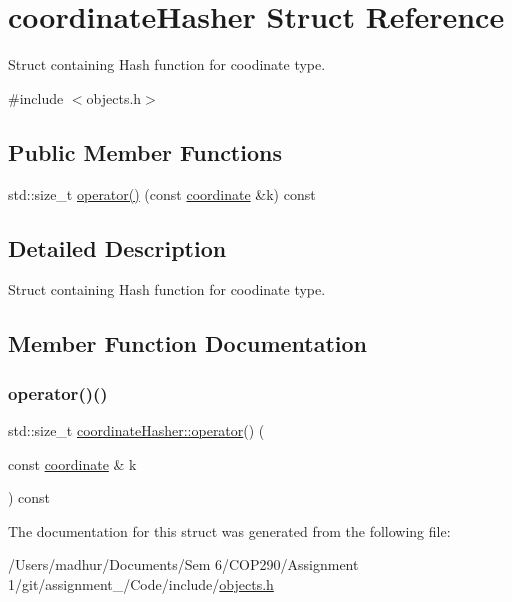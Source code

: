 \hypertarget{structcoordinate_hasher}{}\section{coordinate\+Hasher Struct Reference}
\label{structcoordinate_hasher}


Struct containing Hash function for coodinate type.  




{\ttfamily \#include $<$objects.\+h$>$}

\subsection*{Public Member Functions}
\begin{DoxyCompactItemize}
\item 
std\+::size\+\_\+t \mbox{\hyperlink{structcoordinate_hasher_a665876df3e7e61b5c7353c713bdbdb6c}{operator()}} (const \mbox{\hyperlink{structcoordinate}{coordinate}} \&k) const
\end{DoxyCompactItemize}


\subsection{Detailed Description}
Struct containing Hash function for coodinate type. 

\subsection{Member Function Documentation}
\mbox{\label{structcoordinate_hasher_a665876df3e7e61b5c7353c713bdbdb6c}} 
\subsubsection{\texorpdfstring{operator()()}{operator()()}}
{\footnotesize\ttfamily std\+::size\+\_\+t \mbox{\hyperlink{objects_8h_afc5adb2920a8566a6c3f0402a87d1027}{coordinate\+Hasher\+::operator}}() (\begin{DoxyParamCaption}\item[{const \mbox{\hyperlink{structcoordinate}{coordinate}} \&}]{k }\end{DoxyParamCaption}) const\hspace{0.3cm}{\ttfamily [inline]}}



The documentation for this struct was generated from the following file\+:\begin{DoxyCompactItemize}
\item 
/\+Users/madhur/\+Documents/\+Sem 6/\+C\+O\+P290/\+Assignment 1/git/assignment\+\_/\+Code/include/\mbox{\hyperlink{objects_8h}{objects.\+h}}\end{DoxyCompactItemize}
